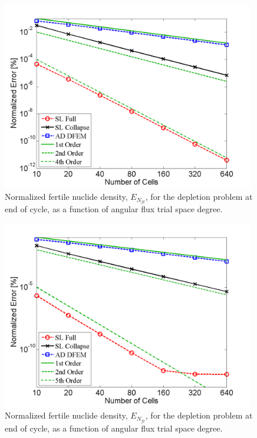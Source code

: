 \begin{figure}[!htp]
\centering
\includegraphics[width=11cm]{chapter5_depletion/ft_P3_norm_err.png}
\caption{Normalized fertile nuclide density, $E_{N_{ft}}$, for the depletion problem at end of cycle, as a function of angular flux trial space degree.}
\label{fig:depletion_NFT_p3}
\end{figure}

\begin{figure}[!hbp]
\centering
\includegraphics[width=11cm]{chapter5_depletion/ft_P4_norm_err.png}
\caption{Normalized fertile nuclide density, $E_{N_{ft}}$, for the depletion problem at end of cycle, as a function of angular flux trial space degree.}
\label{fig:depletion_NFT_p4}
\end{figure}


\pagebreak

